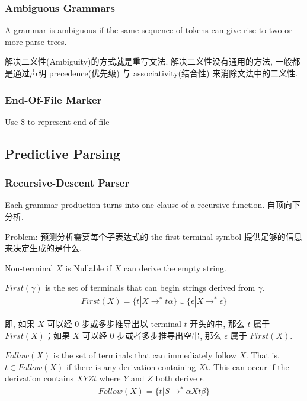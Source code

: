 \subsubsection{Ambiguous Grammars}
A grammar is ambiguous if the same sequence of tokens can give rise to two or more parse trees.

解决二义性(Ambiguity)的方式就是重写文法. 解决二义性没有通用的方法, 一般都是通过声明 precedence(优先级) 与 associativity(结合性) 来消除文法中的二义性.

\subsubsection{End-Of-File Marker}
Use \$ to represent end of file

\subsection{Predictive Parsing}

\subsubsection{Recursive-Descent Parser}
Each grammar production turns into one clause of a recursive function. 自顶向下分析.

Problem: 预测分析需要每个子表达式的 the first terminal symbol 提供足够的信息来决定生成的是什么.

\begin{definition}[Nullable]
    Non-terminal $X$ is Nullable if $X$ can derive the empty string.
\end{definition}

\begin{definition}
    $First(\gamma)$ is the set of terminals that can begin strings derived from $\gamma$.
    \begin{align*}
        First(X)=\{ t|X\to^*t\alpha \}\cup\{ \epsilon | X\to^*\epsilon \}
    \end{align*}
\end{definition}
即, 如果 $X$ 可以经 0 步或多步推导出以 terminal $t$ 开头的串, 那么 $t$ 属于 ${First}(X)$；如果 $X$ 可以经 0 步或者多步推导出空串, 那么 $\epsilon$ 属于 ${First}(X)$. 

\begin{definition}
    $Follow(X)$ is the set of terminals that can immediately follow $X$. That is, $t \in Follow(X)$ if there is any derivation containing $Xt$. This can occur if the derivation contains $XYZt$ where $Y$ and $Z$ both derive $\epsilon$.
    \begin{align*}
        Follow(X)=\{ t|S\to^*\alpha Xt\beta \}
    \end{align*}
\end{definition}

